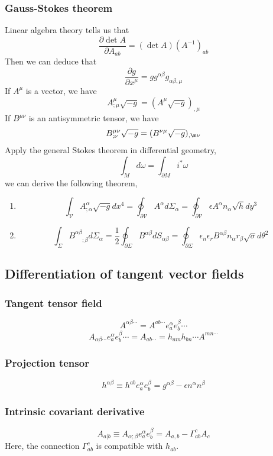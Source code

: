 \subsubsection{Gauss-Stokes theorem}
Linear algebra theory tells us that
\[\frac{\partial \det A}{\partial A_{ab}} = (\det A) \left(A^{-1}\right)_{ab}\]
Then we can deduce that
\[\frac{\partial g}{\partial x^{\mu}} = gg^{\alpha\beta} g_{\alpha\beta,\mu}\]
If $A^{\mu}$ is a vector, we have
\[A^{\mu}_{;\mu}\sqrt{-g} = (A^{\mu}\sqrt{-g})_{,\mu}\]
If $B^{\mu\nu}$ is an antisymmetric tensor, we have
\[B^{\mu\nu}_{;\nu}\sqrt{-g} = (B^{\nu\mu}\sqrt{-g})_{,\m\nu}\]
Apply the general Stokes theorem in differential geometry,
\[\int_{M} d\omega = \int_{\partial M} i^* \omega\]
we can derive the following theorem,\\

\begin{newthem}
\begin{enumerate} 
\item \[\int_{\mathcal{V}} A^{\alpha}_{;\alpha} \sqrt{-g} dx^4 = \oint_{\partial \mathcal{V}} A^{\alpha} d\Sigma_{\alpha} = \oint_{\partial \mathcal{V}} \epsilon A^{\alpha} n_{\alpha} \sqrt{h} dy^3\]
\item \[\int_{\Sigma} B^{\alpha \beta}_{\phantom{\alpha \beta};\beta} d\Sigma_{\alpha} = \frac{1}{2}\oint_{\partial \Sigma} B^{\alpha \beta} dS_{\alpha \beta} = \oint_{\partial \Sigma} \epsilon_n \epsilon_r B^{\alpha \beta} n_{\alpha} r_{\beta} \sqrt{\sigma} d\theta^2\]
\end{enumerate}
\end{newthem}

\subsection{Differentiation of tangent vector fields}
\subsubsection{Tangent tensor field}
\[A^{\alpha \beta \cdots} = A^{ab\cdots} e_a^{\alpha} e_b^{\beta} \cdots\]
\[A_{\alpha \beta \cdots} e_a^{\alpha} e_b^{\beta} \cdots = A_{ab\cdots} = h_{am} h_{bn} \cdots A^{mn\cdots}\]
\subsubsection{Projection tensor}
\[h^{\alpha \beta} \equiv h^{ab}e_a^{\alpha} e_b^{\beta} = g^{\alpha \beta} - \epsilon n^{\alpha} n^{\beta}\]
\subsubsection{Intrinsic covariant derivative}
\[A_{a|b} \equiv A_{\alpha;\beta} e_a^{\alpha} e_b^{\beta} = A_{a,b} - \Gamma^c_{ab}A_c\]
Here, the connection $\Gamma^c_{ab}$ is compatible with $h_{ab}$.
